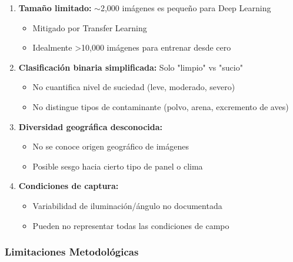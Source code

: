 \documentclass[11pt, a4paper]{article}
\begin{document}
\begin{enumerate}
    \item \textbf{Tamaño limitado:} $\sim$2,000 imágenes es pequeño para Deep Learning
    \begin{itemize}
        \item Mitigado por Transfer Learning
        \item Idealmente >10,000 imágenes para entrenar desde cero
    \end{itemize}
    
    \item \textbf{Clasificación binaria simplificada:} Solo "limpio" vs "sucio"
    \begin{itemize}
        \item No cuantifica nivel de suciedad (leve, moderado, severo)
        \item No distingue tipos de contaminante (polvo, arena, excremento de aves)
    \end{itemize}
    
    \item \textbf{Diversidad geográfica desconocida:}
    \begin{itemize}
        \item No se conoce origen geográfico de imágenes
        \item Posible sesgo hacia cierto tipo de panel o clima
    \end{itemize}
    
    \item \textbf{Condiciones de captura:}
    \begin{itemize}
        \item Variabilidad de iluminación/ángulo no documentada
        \item Pueden no representar todas las condiciones de campo
    \end{itemize}
\end{enumerate}

\subsubsection{Limitaciones Metodológicas}
\end{document}
